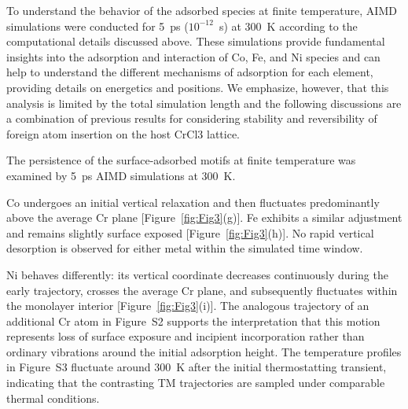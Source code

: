 \documentclass[journal=jacsat,manuscript=article]{achemso}
\begin{document}
{\color{revcolor}%
  To understand the behavior of the adsorbed species at finite temperature, AIMD simulations were conducted for 5~ps ($10^{-12}$~s) at 300~K according to the computational details discussed above. These simulations provide fundamental insights into the adsorption and interaction of Co, Fe, and Ni species and can help to understand the different mechanisms of adsorption for each element, providing details on energetics and positions. We emphasize, however, that this analysis is limited by the total simulation length and the following discussions are a combination of previous results for considering stability and reversibility of foreign atom insertion on the host CrCl3 lattice.
\par}The persistence of the surface-adsorbed motifs at finite temperature was examined by 5~ps AIMD simulations at 300~K.

Co undergoes an initial vertical relaxation and then fluctuates predominantly above the average Cr plane [Figure~\ref{fig:Fig3}(g)]. Fe exhibits a similar adjustment and remains slightly surface exposed [Figure~\ref{fig:Fig3}(h)]. No rapid vertical desorption is observed for either metal within the simulated time window.

Ni behaves differently: its vertical coordinate decreases continuously during the early trajectory, crosses the average Cr plane, and subsequently fluctuates within the monolayer interior [Figure~\ref{fig:Fig3}(i)]. The analogous trajectory of an additional Cr atom in Figure~S2 supports the interpretation that this motion represents loss of surface exposure and incipient incorporation rather than ordinary vibrations around the initial adsorption height. The temperature profiles in Figure~S3 fluctuate around 300~K after the initial thermostatting transient, indicating that the contrasting TM trajectories are sampled under comparable thermal conditions.
\end{document}
